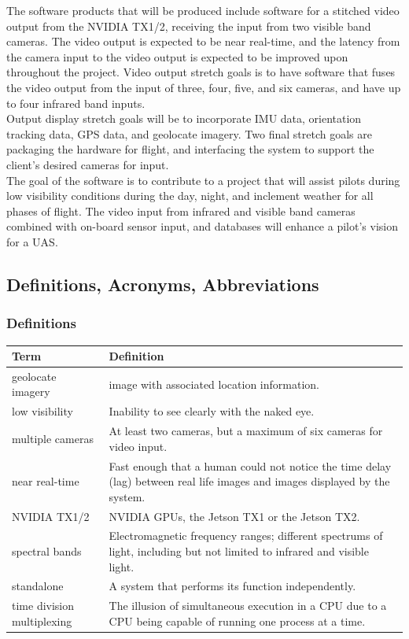 \documentclass[letterpaper,10pt,serif,draftclsnofoot,onecolumn,compsoc,titlepage]{IEEEtran}
\begin{document}
The software products that will be produced include software for a stitched video output 
from the NVIDIA TX1/2, receiving the input from two visible band cameras. 
The video output is expected to be near real-time, and the latency from the camera 
input to the video output is expected to be improved upon throughout the project. Video 
output stretch goals is to have software that fuses the video output from the input of 
three, four, five, and six cameras, and have up to four infrared band inputs.\\

Output display stretch goals will be to incorporate IMU data, orientation tracking 
data, GPS data, and geolocate imagery. Two final stretch goals are packaging the 
hardware for flight, and interfacing the system to support the client's desired 
cameras for input.\\

The goal of the software is to contribute to a project that will assist pilots during 
low visibility conditions during the day, night, and inclement weather for all phases 
of flight. The video input from infrared and visible band cameras combined with 
on-board sensor input, and databases will enhance a pilot's vision for a UAS.\\

\subsection{Definitions, Acronyms, Abbreviations}

\subsubsection{Definitions}

\begin{tabular}{|l|p{11cm}|}
	\hline
	\textbf{Term} & \textbf{Definition}\\
	\hline
	geolocate imagery & image with associated location information.\\
	\hline
	low visibility & Inability to see clearly with the naked eye.\\
	\hline	
	multiple cameras & At least two cameras, but a maximum of six cameras for 
	video input.\\
	\hline
	near real-time & Fast enough that a human could not notice the time 
	delay (lag) between \newline real life images and images displayed by the system.\\
	\hline
	NVIDIA TX1/2 & NVIDIA GPUs, the Jetson TX1 or the Jetson TX2.\\
	\hline
	spectral bands & Electromagnetic frequency ranges; different 
	spectrums of light, including \newline but not limited to infrared 
	and visible light.\\
	\hline
	standalone & A system that performs its function independently. \\
	\hline
	time division multiplexing & The illusion of simultaneous execution in a CPU due
	to a CPU being capable of running one process at a time.\\
	\hline
\end{tabular}
\end{document}
